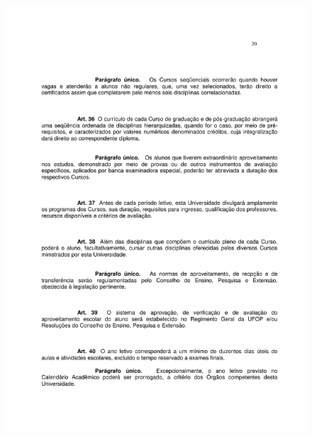 \begin{figure}[p]
	\centering 
	\includegraphics[scale=0.7]{capitulos/resolucoes/cuni414/cuni414-20.pdf}
\end{figure} \pagebreak


